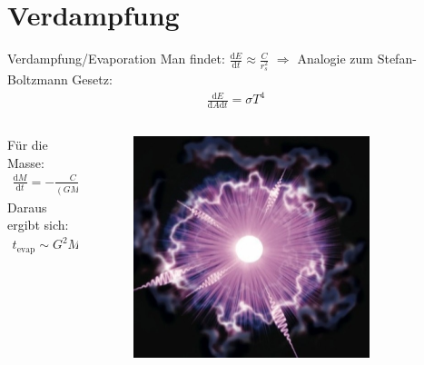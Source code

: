 \documentclass[ngerman,ph]{URbeamer}
\newcommand{\diff}{\mathrm{d}}
\begin{document}
	\section{Verdampfung}
	\begin{frame}{Verdampfung/Evaporation}	
	Man findet: $\frac{\diff E}{\diff t} \approx \frac{C}{r_s^2}$
	$\Rightarrow$ Analogie zum Stefan-Boltzmann Gesetz:
		\begin{align*}
			\frac{\diff E}{\diff A \diff t} = \sigma T^4
		\end{align*}
	\begin{columns}	
		\begin{column}{0.5\textwidth}	
		Für die Masse:
			\begin{align*}
				\frac{\diff M}{\diff t} = - \frac{C}{(GM)^2}
			\end{align*}
		Daraus ergibt sich:
			\begin{align*}
				t_{\text{evap}} \sim G^2 M^3
			\end{align*} 
		\end{column}
		\begin{column}{0.5\textwidth}
			\begin{figure} [h] 
					\includegraphics[width=0.8\textwidth]{evaporation}
			\end{figure}
		 \end{column}
	\end{columns}
	\end{frame}
	
\end{document}
